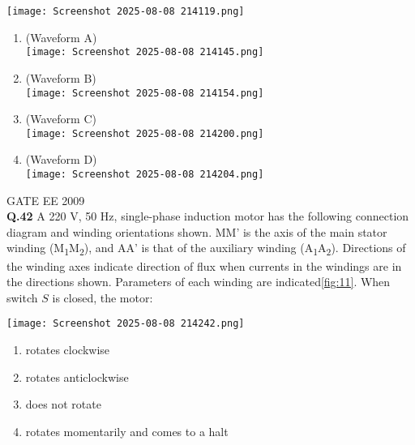 \documentclass[12pt]{article}
\begin{document}
\vspace{0.3cm}

\begin{center}
    \texttt{[image: Screenshot 2025-08-08 214119.png]} \\[0.5cm]
  \label{fig:10}
\end{center}

\begin{enumerate}
    \item (Waveform A) \\
    \texttt{[image: Screenshot 2025-08-08 214145.png]}
    \item (Waveform B) \\
    \texttt{[image: Screenshot 2025-08-08 214154.png]}
    \item (Waveform C) \\
    \texttt{[image: Screenshot 2025-08-08 214200.png]}
    \item (Waveform D) \\
    \texttt{[image: Screenshot 2025-08-08 214204.png]}
\end{enumerate}

\vspace{0.5cm}
\hspace{10pt}
GATE EE 2009\\
\noindent\textbf{Q.42} A 220 V, 50 Hz, single-phase induction motor has the following connection diagram and winding orientations shown. MM' is the axis of the main stator winding (M\textsubscript{1}M\textsubscript{2}), and AA' is that of the auxiliary winding (A\textsubscript{1}A\textsubscript{2}). Directions of the winding axes indicate direction of flux when currents in the windings are in the directions shown. Parameters of each winding are indicated\ref{fig:11}. When switch $S$ is closed, the motor:

\vspace{0.3cm}

\begin{center}
\centering
    \texttt{[image: Screenshot 2025-08-08 214242.png]}
    \label{fig:11}
\end{center}

\begin{enumerate}
    \item rotates clockwise
    \item rotates anticlockwise
    \item does not rotate
    \item rotates momentarily and comes to a halt
\end{enumerate}
\end{document}
